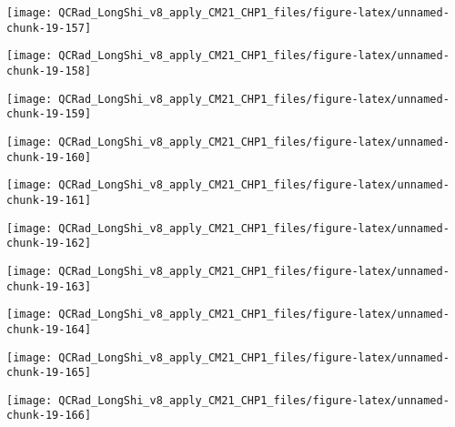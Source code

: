 \documentclass[
  10pt,
  a4paper,oneside]{article}
\begin{document}
\begin{center}\texttt{[image: QCRad\_LongShi\_v8\_apply\_CM21\_CHP1\_files/figure-latex/unnamed-chunk-19-157]} \end{center}

\begin{center}\texttt{[image: QCRad\_LongShi\_v8\_apply\_CM21\_CHP1\_files/figure-latex/unnamed-chunk-19-158]} \end{center}

\begin{center}\texttt{[image: QCRad\_LongShi\_v8\_apply\_CM21\_CHP1\_files/figure-latex/unnamed-chunk-19-159]} \end{center}

\begin{center}\texttt{[image: QCRad\_LongShi\_v8\_apply\_CM21\_CHP1\_files/figure-latex/unnamed-chunk-19-160]} \end{center}

\begin{center}\texttt{[image: QCRad\_LongShi\_v8\_apply\_CM21\_CHP1\_files/figure-latex/unnamed-chunk-19-161]} \end{center}

\begin{center}\texttt{[image: QCRad\_LongShi\_v8\_apply\_CM21\_CHP1\_files/figure-latex/unnamed-chunk-19-162]} \end{center}

\begin{center}\texttt{[image: QCRad\_LongShi\_v8\_apply\_CM21\_CHP1\_files/figure-latex/unnamed-chunk-19-163]} \end{center}

\begin{center}\texttt{[image: QCRad\_LongShi\_v8\_apply\_CM21\_CHP1\_files/figure-latex/unnamed-chunk-19-164]} \end{center}

\begin{center}\texttt{[image: QCRad\_LongShi\_v8\_apply\_CM21\_CHP1\_files/figure-latex/unnamed-chunk-19-165]} \end{center}

\begin{center}\texttt{[image: QCRad\_LongShi\_v8\_apply\_CM21\_CHP1\_files/figure-latex/unnamed-chunk-19-166]} \end{center}
\end{document}
